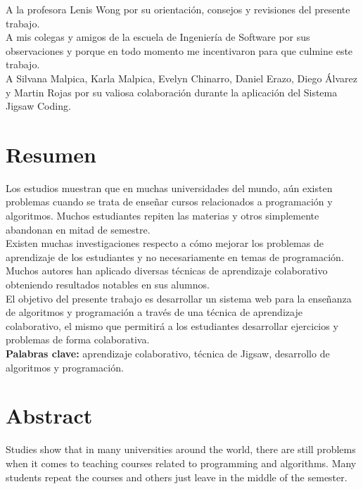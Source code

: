 A la profesora Lenis Wong por su orientación, consejos  y revisiones del presente trabajo.\\

A mis colegas y amigos de la escuela de Ingeniería de Software por sus observaciones y porque en todo momento me incentivaron para que culmine este trabajo.\\

A Silvana Malpica, Karla Malpica, Evelyn Chinarro, Daniel Erazo, Diego Álvarez y Martin Rojas por su valiosa colaboración durante la aplicación del Sistema Jigsaw Coding.

\chapter*{Resumen}

Los estudios muestran que en muchas universidades del mundo, aún existen problemas cuando se trata de enseñar cursos relacionados a programación y algoritmos. Muchos estudiantes repiten las materias y otros simplemente abandonan en mitad de semestre.\\

Existen muchas investigaciones respecto a cómo mejorar los problemas de aprendizaje de los estudiantes y no necesariamente en temas de programación. Muchos autores han aplicado diversas técnicas de aprendizaje colaborativo obteniendo resultados notables en sus alumnos.\\

El objetivo del presente trabajo es desarrollar un sistema web para la enseñanza de algoritmos y programación a través de una técnica de aprendizaje colaborativo, el mismo que permitirá a los estudiantes desarrollar ejercicios y problemas de forma colaborativa.\\

\textbf{Palabras clave:} aprendizaje colaborativo, técnica de Jigsaw, desarrollo de algoritmos y programación.

\chapter*{Abstract}
Studies show that in many universities around the world, there are still problems when it comes to teaching courses related to programming and algorithms. Many students repeat the courses and others just leave in the middle of the semester. \\

